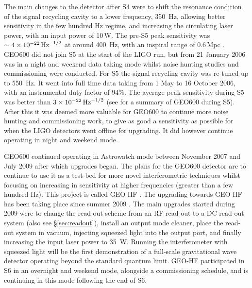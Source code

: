 \documentclass{article}
\begin{document}
The main changes to the detector after S4 were to shift the resonance condition
of the signal recycling cavity to a lower frequency, 350~Hz, allowing better
sensitivity in the few hundred Hz regime, and increasing the circulating laser
power, with an input power of 10\,W. The pre-S5 peak sensitivity was
$\sim4\times10^{-22}\,{\rm Hz}^{-1/2}$ at around 400~Hz, with an inspiral
range of 0.6\,Mpc \cite{Hild:2006b}. GEO600 did not join S5 at the start of the
LIGO run, but from 21 January 2006 was in a night and weekend data taking mode
whilst noise hunting studies and commissioning were conducted. For S5 the signal
recycling cavity was re-tuned up to 550~Hz. It went into full time data taking
from 1 May to 16 October 2006, with an instrumental duty factor of 94\%. The
average peak sensitivity during S5 was better than $3\times10^{-22}\,{\rm
Hz}^{-1/2}$ (see \cite{Willke:2007} for a summary of GEO600 during S5). After
this it was deemed more valuable for GEO600 to continue more noise hunting and
commissioning work, to give as good a sensitivity as possible for when the LIGO
detectors went offline for upgrading. It did however continue operating in night
and weekend mode.

GEO600  continued operating in Astrowatch mode between November 2007 and July
2009 after which upgrades began. The plans for the GEO600 detector are to
continue to use it as a test-bed for more novel interferometric techniques
whilst focusing on increasing in sensitivity at higher frequencies (greater than
a few hundred Hz). This project is called GEO-HF \cite{Willke:2006}. The
upgrading towards GEO-HF has been taking place since summer 2009
\cite{Grote:2010}. The main upgrades started during 2009 were to change the
read-out scheme from an RF read-out to a DC read-out system \cite{Hild:2008}
(also see \S\ref{sec:readout}), install an output mode cleaner, place the
read-out system in vacuum, injecting squeezed light \cite{Vahlbruch:2008,
Chelkowski:2007} into the output port, and finally increasing the input laser
power to 35~W. Running the interferometer with squeezed light will be the first
demonstration of a full-scale gravitational wave detector operating beyond the
standard quantum limit. GEO-HF participated in S6 in an overnight and weekend
mode, alongside a commissioning schedule, and is continuing in this mode
following the end of S6.
\end{document}
